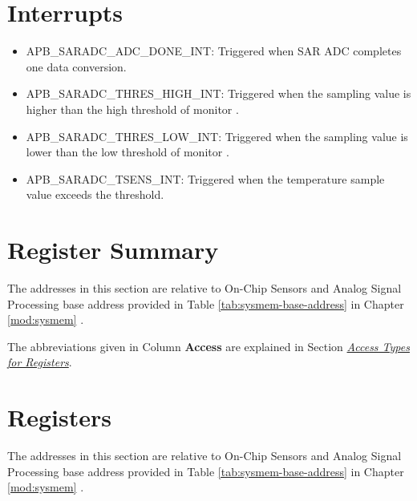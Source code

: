 \documentclass[main\_\_EN.tex]{subfiles}
\begin{document}
\section{Interrupts}
\begin{itemize}
   \item \label{int:SARADCDONEINT1} APB\_SARADC\_ADC\_DONE\_INT: Triggered when SAR ADC completes one data conversion.
   \item \label{int:APBSARADCTHRESxHIGHINT} APB\_SARADC\_THRES\_HIGH\_INT: Triggered when the sampling value is higher than the high threshold of monitor .
   \item \label{int:APBSARADCTHRESxLOWINT} APB\_SARADC\_THRES\_LOW\_INT: Triggered when the sampling value is lower than the low threshold of monitor .
   \item \label{int:APBSARADCTSENSINT} APB\_SARADC\_TSENS\_INT: Triggered when the temperature sample value exceeds the threshold.
\end{itemize}




\clearpage
\hypertarget{sensor-reg-summ}{}
\section{Register Summary}
\label{sec:sensor-reg-summ}

The addresses in this section are relative to On-Chip Sensors and Analog Signal Processing base address provided in Table \ref{tab:sysmem-base-address} in Chapter \ref{mod:sysmem} \textit{}.

The abbreviations given in Column \textbf{Access} are explained in Section \hyperref[glossary-access-types]{\textit{Access Types for Registers}}.







\clearpage
\section{Registers}

The addresses in this section are relative to On-Chip Sensors and Analog Signal Processing base address provided in Table \ref{tab:sysmem-base-address} in Chapter \ref{mod:sysmem} \textit{}.


\end{document}
